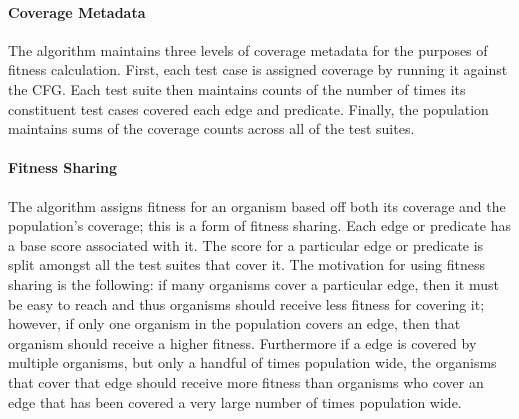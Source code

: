 \documentclass[runningheads]{llncs}
\begin{document}
\paragraph{Coverage Metadata}
The algorithm maintains three levels of coverage metadata for the purposes of fitness calculation. First, each test case is assigned coverage by running it against the CFG. Each test suite then maintains counts of the number of times its constituent test cases covered each edge and predicate. Finally, the population maintains sums of the coverage counts across all of the test suites.

\paragraph{Fitness Sharing}
The algorithm assigns fitness for an organism based off both its coverage and the population's coverage; this is a form of fitness sharing. Each edge or predicate has a base score associated with it. The score for a particular edge or predicate is split amongst all the test suites that cover it. The motivation for using fitness sharing is the following: if many organisms cover a particular edge, then it must be easy to reach and thus organisms should receive less fitness for covering it; however, if only one organism in the population covers an edge, then that organism should receive a higher fitness. Furthermore if a edge is covered by multiple organisms, but only a handful of times population wide, the organisms that cover that edge should receive more fitness than organisms who cover an edge that has been covered a very large number of times population wide.

\begin{comment} Probably not needed.
\subsubsection{Test Case Generation and Search} 
The main test case search occurs by crossing over and mutating test cases within organisms, as well as applying local optimization heuristics that manipulate or replace an organism's test cases. As mentioned above the algorithm begins by thoroughly searching the space of possible test cases composed of parameters from singular ranges of the range set. After many generations of no improvements using test case crossover and local optimization, the algorithm performs two key perturbation procedures. First the range set adapts itself based on information learned regarding the fruitfulness of its constituent ranges. Then test suite crossover and mutation are applied to mix up the available input parameters inside of test suites.
\end{comment}
\end{document}
